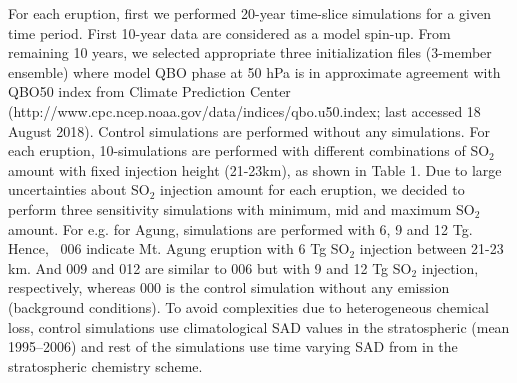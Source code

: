 \documentclass[acpd, hvmath, online]{copernicus_discussions}
\newcommand\Agu00{{\bf Agu00}}
\newcommand\Agu06{{\bf Agu06}}
\newcommand\Agu09{{\bf Agu06}}
\newcommand\Agu12{{\bf Agu12}}
\begin{document}
For each eruption, first we performed 20-year time-slice simulations for a given 
time period. First 10-year data are considered as a model spin-up.  From remaining 
10 years, we selected appropriate three initialization files (3-member ensemble)
 where model QBO phase at 50 hPa is in approximate agreement with QBO50 index from
 Climate Prediction Center (http://www.cpc.ncep.noaa.gov/data/indices/qbo.u50.index; 
last accessed 18 August 2018). Control simulations are performed without any simulations.
 For each eruption, 10-simulations are performed with different combinations of SO$_2$ amount
with fixed injection height (21-23km), as shown in Table 1.   
Due to large uncertainties about SO$_2$ injection amount for each eruption, we decided to 
perform three sensitivity simulations with minimum, mid and maximum SO$_2$ amount. For e.g. 
for Agung, simulations are performed with 6, 9 and 12 Tg. 
Hence, ~\Agu06 indicate Mt. Agung eruption with 6 Tg SO$_2$ injection 
between 21-23 km. And \Agu09 and \Agu12  are similar to \Agu06 but
 with 9 and 12 Tg SO$_2$ injection, respectively, whereas \Agu00 is the
control simulation without any  emission (background conditions). 
To avoid complexities due to heterogeneous 
chemical loss, control simulations use climatological SAD values in the
stratospheric (mean 1995--2006) and rest of the simulations use time varying SAD from 
\cite{Arfeuille2013} in the stratospheric chemistry scheme. 
\end{document}
